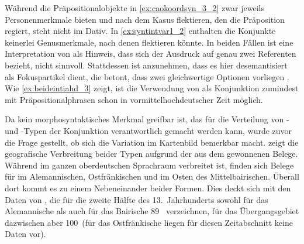 Während die Präpositionalobjekte in \cref{ex:caokoordsyn_3_2} zwar jeweils
Personenmerkmale bieten und nach dem Kasus flektieren, den die Präposition
regiert, steht  nicht im Dativ.
In \cref{ex:syntintvar1_2} enthalten die Konjunkte keinerlei Genusmerkmale,
nach denen  flektieren könnte. In beiden Fällen ist eine
Interpretation von  als Hinweis, dass sich der Ausdruck auf genau
zwei Referenten bezieht, nicht sinnvoll. Stattdessen ist anzunehmen, dass es
hier desemantisiert als Fokuspartikel dient, die betont, dass zwei
gleichwertige Optionen vorliegen \autocite[425--428]{johannessen2005}. Wie
\cref{ex:beideintiahd_3} zeigt, ist die Verwendung von  als
Konjunktion zumindest mit Präpositionalphrasen schon in vormittelhochdeutscher
Zeit möglich.

Da kein morphosyntaktisches Merkmal greifbar ist, das für die Verteilung von
- und -Typen der Konjunktion verantwortlich gemacht
werden kann, wurde zuvor die Frage gestellt, ob sich die Variation im
Kartenbild bemerkbar macht.  zeigt die geografische
Verbreitung beider Typen aufgrund der aus dem  gewonnenen
Belege. Während  im ganzen oberdeutschen Sprachraum verbreitet
ist, finden sich Belege für 
im Alemannischen, Ostfränkischen und im Osten des Mittelbairischen. Überall
dort kommt es zu einem Nebeneinander beider Formen.
%
Dies deckt sich mit den Daten von \citet[627]{ksw2}, die für die zweite Hälfte
des 13.~Jahrhunderts sowohl für das Alemannische als auch für das Bairische
89\pct\  verzeichnen, für das Übergangsgebiet dazwischen aber
100\pct\ (für das Ostfränkische liegen für diesen Zeitabschnitt keine Daten
vor).


